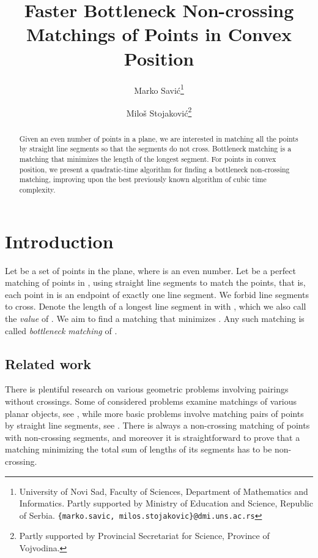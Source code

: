 \documentclass[a4paper, 11pt]{article}
\begin{document}
\title{Faster Bottleneck Non-crossing Matchings of Points in Convex Position}
\date{}


\author{
	Marko Savi\'{c}\footnote{University of Novi Sad, Faculty of Sciences, Department of Mathematics and Informatics. Partly supported by Ministry of Education and Science, Republic of Serbia. {\tt \{marko.savic, milos.stojakovic\}@dmi.uns.ac.rs}}
	\and
	Milo\v{s} Stojakovi\'{c}\footnotemark[1] \footnote{Partly supported by Provincial Secretariat for Science, Province of Vojvodina.}
}

\maketitle

\begin{abstract}
	Given an even number of points in a plane, we are interested in matching all the points by straight line segments so that the segments do not cross. Bottleneck matching is a matching that minimizes the length of the longest segment. For points in convex position, we present a quadratic-time algorithm for finding a bottleneck non-crossing matching, improving upon the best previously known algorithm of cubic time complexity.
\end{abstract}




\section {Introduction}


Let  be a set of  points in the plane, where  is an even number. Let  be a perfect matching of points in , using  straight line segments to match the points, that is, each point in  is an endpoint of exactly one line segment. We forbid line segments to cross. Denote the length of a longest line segment in  with , which we also call the \emph{value} of . We aim to find a matching that minimizes . Any such matching is called \emph{bottleneck matching} of .

\subsection{Related work}

There is plentiful research on various geometric problems involving pairings without crossings. Some of considered problems examine matchings of various planar objects, see \cite{aloupis2013non, aloupis2015matching, kratochvil2013non}, while more basic problems involve matching pairs of points by straight line segments, see \cite{aichholzer2010edge, aichholzer2009compatible, alon1993long}. There is always a non-crossing matching of points with non-crossing segments, and moreover it is straightforward to prove that a matching minimizing the total sum of lengths of its segments has to be non-crossing.
\end{document}
